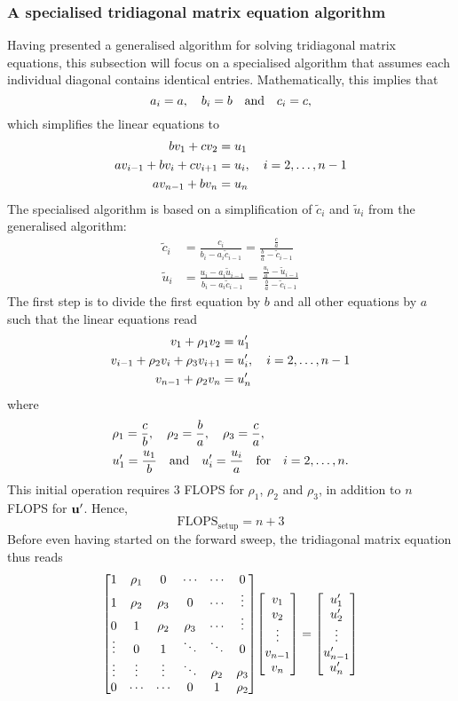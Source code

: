 \documentclass[reprint,english]{revtex4-1}
\begin{document}
\subsubsection{A specialised tridiagonal matrix equation algorithm}\label{sec:special_tridiagonal_algorithm}
Having presented a generalised algorithm for solving tridiagonal matrix equations, this subsection will focus on a specialised algorithm that assumes each individual diagonal contains identical entries. Mathematically, this implies that
\[a_i=a\qc b_i=b\qand c_i=c,\]
which simplifies the linear equations to
\begin{align*}
bv_1+cv_2&=u_1\\
av_{i-1}+bv_i+cv_{i+1}&=u_i\qc i=2,\ldots,n-1\\
av_{n-1}+bv_n&=u_n
\end{align*}
The specialised algorithm is based on a simplification of \(\tilde{c}_i\) and \(\tilde{u}_i\) from the generalised algorithm:
\begin{align*}
\tilde{c}_i&=\frac{c_i}{b_i-a_i\tilde{c}_{i-1}}=\frac{\frac{c}{a}}{\frac{b}{a}-\tilde{c}_{i-1}}\\
\tilde{u}_i&=\frac{u_i-a_i\tilde{u}_{i-1}}{b_i-a_i\tilde{c}_{i-1}}=\frac{\frac{u_i}{a}-\tilde{u}_{i-1}}{\frac{b}{a}-\tilde{c}_{i-1}}
\end{align*}
The first step is to divide the first equation by \(b\) and all other equations by \(a\) such that the linear equations read
\begin{align*}
v_1+\rho_1v_2&=u'_1\\
v_{i-1}+\rho_2v_i+\rho_3v_{i+1}&=u'_i\qc i=2,\ldots,n-1\\
v_{n-1}+\rho_2v_n&=u'_n
\end{align*}
where
\begin{align*}
&\rho_1=\frac{c}{b}\qc\rho_2=\frac{b}{a}\qc\rho_3=\frac{c}{a},\\
&u'_1=\frac{u_1}{b}\qand u'_i=\frac{u_i}{a}\qq{for}i=2,\ldots,n.
\end{align*}
This initial operation requires 3 FLOPS for \(\rho_1\), \(\rho_2\) and \(\rho_3\), in addition to \(n\) FLOPS for \(\vb{u}'\). Hence,
\begin{equation}
\text{FLOPS}_{\text{setup}}=n+3
\end{equation}
Before even having started on the forward sweep, the tridiagonal matrix equation thus reads
\[\mqty[1 & \rho_1 & 0 & \cdots & \cdots & 0 \\
1 & \rho_2 & \rho_3 & 0 & \cdots & \vdots \\
0 & 1 & \rho_2 & \rho_3 & \cdots & \vdots \\
\vdots & 0 & 1 & \ddots & \ddots & 0 \\
\vdots & \vdots & \vdots & \ddots & \rho_2 & \rho_3 \\
0 & \cdots & \cdots & 0 & 1 & \rho_2]\mqty[v_1 \\ v_2 \\ \vdots \\ v_{n-1} \\ v_n]=\mqty[u'_1 \\ u'_2 \\ \vdots \\ u'_{n-1} \\ u'_n]\]
\end{document}
